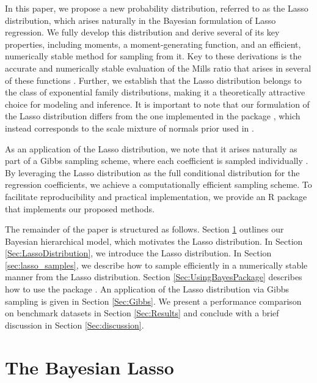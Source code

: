 In this paper, we propose a new probability distribution, referred to as the Lasso distribution, which arises naturally in the Bayesian formulation of Lasso regression. We fully develop this distribution and derive several of its key properties, including moments, a moment-generating function, and an efficient, numerically stable method for sampling from it. 
Key to these derivations is the accurate and numerically stable evaluation of the Mills ratio that arises in several of these functions \citep{Mills1926}. 
Further, we establish that the Lasso distribution belongs to the class of exponential family distributions, making it a theoretically attractive choice for modeling and inference. 
It is important to note that our formulation of the Lasso distribution differs from the one implemented in the  package \citep{LaplacesDemon}, which instead corresponds to the scale mixture of normals prior used in \citet{park2008bayesian}.

As an application of the Lasso distribution, we note that it arises naturally as part of a Gibbs sampling scheme, where each coefficient is sampled individually \citep[see][]{hans2009bayesian}. By leveraging the Lasso distribution as the full conditional distribution for the regression coefficients, we achieve a computationally efficient 
sampling scheme. To facilitate reproducibility and practical implementation, we provide an R package that implements our proposed methods.


The remainder of the paper is structured as follows. Section \ref{Sec:Bayes_Lasso} outlines our Bayesian hierarchical model, which motivates the Lasso distribution. In Section \ref{Sec:LassoDistribution}, we introduce the Lasso distribution. In Section \ref{sec:lasso_samples}, we describe how to sample efficiently in a numerically stable manner from the Lasso distribution. Section \ref{Sec:UsingBayesPackage} describes how to use the package . An application of the Lasso distribution via Gibbs sampling is given in Section \ref{Sec:Gibbs}. We present a performance comparison on benchmark datasets in  Section \ref{Sec:Results} and conclude with a brief discussion in Section \ref{Sec:discussion}. 






\section{The Bayesian Lasso}
\label{Sec:Bayes_Lasso}

